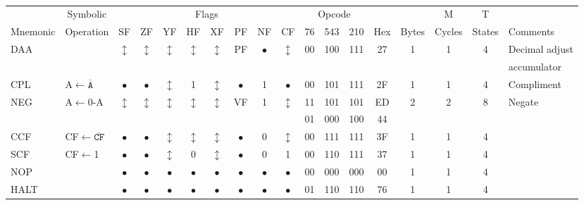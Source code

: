\documentclass[oneside,a4paper]{book}
\begin{document}
{\tt \scriptsize \setlength{\fboxsep}{0.25mm}
\setlength{\tabcolsep}{1mm}
\begin{tabular}{llc@{ }c@{ }c@{ }c@{ }c@{ }c@{ }c@{ }cc@{ }c@{ }cccccll}\hline
 & \multicolumn{1}{c}{Symbolic} & \multicolumn{8}{c}{Flags} & \multicolumn{3}{c}{Opcode} & & & M & T & \\
Mnemonic & \multicolumn{1}{c}{Operation} & SF & ZF & YF & HF & XF & PF & NF & CF & 76 & 543 & 210 
	& Hex & Bytes & Cycles & States & \multicolumn{2}{l}{Comments} \\ \hline

DAA &  & 
	$\updownarrow$ & $\updownarrow$ & $\updownarrow$ & $\updownarrow$ & $\updownarrow$ & PF & $\bullet$ & $\updownarrow$ & 00 & 100 & 111
	& 27 & 1 & 1 & 4 & \multicolumn{2}{l}{Decimal adjust} \\
 \multicolumn{17}{c}{} & \multicolumn{2}{l}{accumulator}  \\

CPL & A$\leftarrow\mathtt{\overline{A}}$ & 
	$\bullet$ & $\bullet$ & $\updownarrow$ & 1 & $\updownarrow$ & $\bullet$ & 1 & $\bullet$ & 00 & 101 & 111
	& 2F & 1 & 1 & 4 & \multicolumn{2}{l}{Compliment} \\

NEG & A$\leftarrow$0-A & 
	$\updownarrow$ & $\updownarrow$ & $\updownarrow$ & $\updownarrow$ & $\updownarrow$ & VF & 1 & $\updownarrow$ & 11 & 101 & 101 
	& ED & 2 & 2 & 8 & \multicolumn{2}{l}{Negate} \\
\multicolumn{10}{c}{} & 01 & 000 & 100 & 44 & \multicolumn{3}{c}{} & & \\ 

CCF & CF$\leftarrow\mathtt{\overline{CF}}$ & 
	$\bullet$ & $\bullet$ & $\updownarrow$\footnotemark[1] & $\updownarrow$\footnotemark[2] & $\updownarrow$\footnotemark[1] & 
	$\bullet$ & 0 & $\updownarrow$ & 00 & 111 & 111
	& 3F & 1 & 1 & 4 & & \\

SCF & CF$\leftarrow$1 & 
	$\bullet$ & $\bullet$ & $\updownarrow$\footnotemark[1] & 0 & $\updownarrow$\footnotemark[1] & $\bullet$ & 0 & 1 & 00 & 110 & 111
	& 37 & 1 & 1 & 4 & & \\

NOP & & 
	$\bullet$ & $\bullet$ & $\bullet$ & $\bullet$ & $\bullet$ & $\bullet$ & $\bullet$ & $\bullet$ & 00 & 000 & 000
	& 00 & 1 & 1 & 4 & & \\

HALT & & 
	$\bullet$ & $\bullet$ & $\bullet$ & $\bullet$ & $\bullet$ & $\bullet$ & $\bullet$ & $\bullet$ & 01 & 110 & 110
	& 76 & 1 & 1 & 4 & & \\


\end{tabular}}
\end{document}
